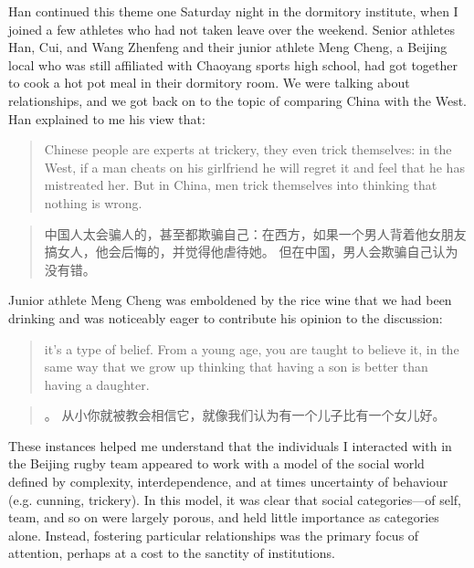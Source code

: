 \begin{CJK}{UTF8}{gbsn}
Han continued this theme one Saturday night in the dormitory institute, when I joined a few athletes who had not taken leave over the weekend.  Senior athletes Han, Cui, and Wang Zhenfeng and their junior athlete Meng Cheng, a Beijing local who was still affiliated with Chaoyang sports high school, had got together to cook a hot pot meal in their dormitory room.  We were talking about relationships, and we got back on to the topic of comparing China with the West.  Han explained to me his view that:

\begin{quotation}
  Chinese people are experts at trickery, they even trick themselves: in the West, if a man cheats on his girlfriend he will regret it and feel that he has mistreated her.  But in China, men trick themselves into thinking that nothing is wrong.
\end{quotation}

\begin{quotation}
  中国人太会骗人的，甚至都欺骗自己：在西方，如果一个男人背着他女朋友搞女人，他会后悔的，并觉得他虐待她。 但在中国，男人会欺骗自己认为没有错。
\end{quotation}

Junior athlete Meng Cheng was emboldened by the rice wine that we had been drinking and was noticeably eager to contribute his opinion to the discussion:

  \begin{quotation}
    \textellipsis it's a type of belief. From a young age, you are taught to believe it, in the same way that we grow up thinking that having a son is better than having a daughter.
  \end{quotation}

  \begin{quotation}
    。 从小你就被教会相信它，就像我们认为有一个儿子比有一个女儿好。
  \end{quotation}

These instances helped me understand that the individuals I interacted with in the Beijing rugby team appeared to work with a model of the social world defined by complexity, interdependence, and at times uncertainty of behaviour (e.g. cunning, trickery).  In this model, it was clear that social categories---of self, team, and so on were largely porous, and held little importance as categories alone.  Instead, fostering particular relationships was the primary focus of attention, perhaps at a cost to the sanctity of institutions.




\end{CJK}
